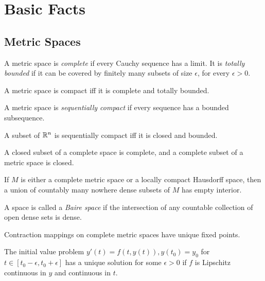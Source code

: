 \documentclass[letterpaper,11pt]{report}
\begin{document}
\section{Basic Facts}

\subsection{Metric Spaces}

\begin{defn} A metric space is \emph{complete} if every Cauchy sequence has a limit. It is \emph{totally bounded} if it can be covered by finitely many subsets of size $\epsilon$, for every $\epsilon > 0$.
\end{defn}

\begin{thm} A metric space is compact iff it is complete and totally bounded.
\end{thm}

\begin{defn} A metric space is \emph{sequentially compact} if every sequence has a bounded subsequence.
\end{defn}

\begin{thm} A subset of $\mathbb{R}^n$ is sequentially compact iff it is closed and bounded.
\end{thm}

\begin{prop} A closed subset of a complete space is complete, and a complete subset of a metric space is closed.
\end{prop}

\begin{thm} If $M$ is either a complete metric space or a locally compact Hausdorff space, then a union of countably many nowhere dense subsets of $M$ has empty interior.
\end{thm}

\begin{defn} A space is called a \emph{Baire space} if the intersection of any countable collection of open dense sets is dense.
\end{defn}

\begin{thm} Contraction mappings on complete metric spaces have unique fixed points.
\end{thm}

\begin{cor} The initial value problem $y'(t) = f(t,y(t)), y(t_0) = y_0$ for $t \in [t_0-\epsilon,t_0+\epsilon]$ has a unique solution for some $\epsilon > 0$ if $f$ is Lipschitz continuous in $y$ and continuous in $t$.
\end{cor}
\end{document}
